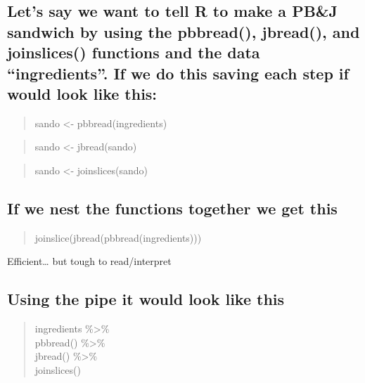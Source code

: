 \documentclass[
]{book}
\begin{document}
\hypertarget{lets-say-we-want-to-tell-r-to-make-a-pbj-sandwich-by-using-the-pbbread-jbread-and-joinslices-functions-and-the-data-ingredients.-if-we-do-this-saving-each-step-if-would-look-like-this}{%
\subsection{Let's say we want to tell R to make a PB\&J sandwich by using the pbbread(), jbread(), and joinslices() functions and the data ``ingredients''. If we do this saving each step if would look like this:}\label{lets-say-we-want-to-tell-r-to-make-a-pbj-sandwich-by-using-the-pbbread-jbread-and-joinslices-functions-and-the-data-ingredients.-if-we-do-this-saving-each-step-if-would-look-like-this}}

\begin{quote}
sando \textless- pbbread(ingredients)
\end{quote}

\begin{quote}
sando \textless- jbread(sando)
\end{quote}

\begin{quote}
sando \textless- joinslices(sando)
\end{quote}

\hypertarget{if-we-nest-the-functions-together-we-get-this}{%
\subsection{If we nest the functions together we get this}\label{if-we-nest-the-functions-together-we-get-this}}

\begin{quote}
joinslice(jbread(pbbread(ingredients)))
\end{quote}

Efficient\ldots{} but tough to read/interpret

\hypertarget{using-the-pipe-it-would-look-like-this}{%
\subsection{Using the pipe it would look like this}\label{using-the-pipe-it-would-look-like-this}}

\begin{quote}
ingredients \%\textgreater\%\\
pbbread() \%\textgreater\%\\
jbread() \%\textgreater\%\\
joinslices()
\end{quote}
\end{document}
